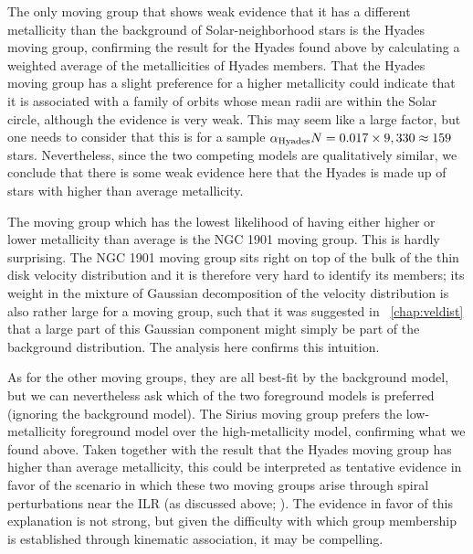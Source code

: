 The only moving group that shows weak evidence that it has a different
metallicity than the background of Solar-neighborhood stars is the
Hyades moving group, confirming the result for the Hyades found above
by calculating a weighted average of the metallicities of Hyades
members. That the Hyades moving group has a slight preference for a
higher metallicity could indicate that it is associated with a family
of orbits whose mean radii are within the Solar circle, although the
evidence is very weak. This may seem like a large factor, but one
needs to consider that this is for a sample $\alpha_{\mathrm{Hyades}}
N = 0.017 \times 9,330 \approx 159$ stars. Nevertheless,
since the two competing models are qualitatively similar, we conclude
that there is some weak evidence here that the Hyades is made up of
stars with higher than average metallicity.

The moving group which has the lowest likelihood of having either
higher or lower metallicity than average is the NGC 1901 moving
group. This is hardly surprising. The NGC 1901 moving group sits right
on top of the bulk of the thin disk velocity distribution and it is
therefore very hard to identify its members; its weight in the mixture
of Gaussian decomposition of the velocity distribution is also rather
large for a moving group, such that it was suggested
in \chaptername~\ref{chap:veldist} that a large part of this Gaussian
component might simply be part of the background distribution. The
analysis here confirms this intuition.

As for the other moving groups, they are all best-fit by the
background model, but we can nevertheless ask which of the two
foreground models is preferred (ignoring the background model). The
Sirius moving group prefers the low-metallicity foreground model over
the high-metallicity model, confirming what we found above. Taken
together with the result that the Hyades moving group has higher than
average metallicity, this could be interpreted as tentative evidence
in favor of the scenario in which these two moving groups arise
through spiral perturbations near the ILR (as discussed above;
\citealt{Quillen05a}). The evidence in favor of this explanation is
not strong, but given the difficulty with which group membership is
established through kinematic association, it may be compelling.

